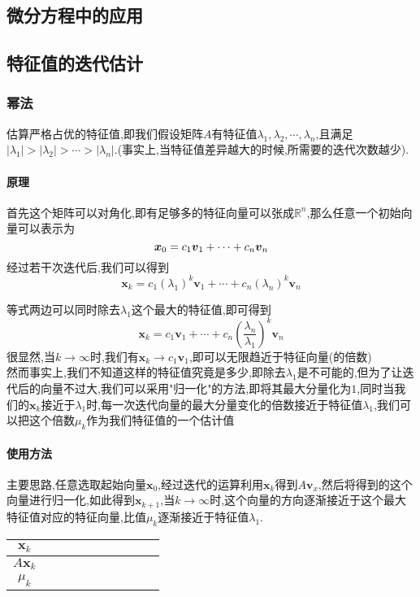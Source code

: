 \documentclass{article}
\newcommand{\RR}{\mathbb{R}}
\newcommand{\ve}{\boldsymbol}
\begin{document}
\begin{CJK}{UTF8}{gkai}
\subsection{微分方程中的应用}

\subsection{特征值的迭代估计}
\subsubsection{幂法}
估算严格占优的特征值,即我们假设矩阵$A$有特征值$\lambda_1 ,\lambda_2,\cdots,\lambda_n$,且满足$|\lambda_1|>|\lambda_2|>\cdots > |\lambda_n|$.(事实上,当特征值差异越大的时候,所需要的迭代次数越少).\\

\paragraph{原理\\}
首先这个矩阵可以对角化,即有足够多的特征向量可以张成$\RR^n$,那么任意一个初始向量可以表示为
\[\ve{x}_0 = \cvs{c}{v}{+}{1}{n}\]
经过若干次迭代后,我们可以得到
\[\ve{x}_k = c_1 (\lambda_1)^k \ve{v}_1 + \cdots + c_n (\lambda_n)^k \ve{v}_n\]

等式两边可以同时除去$\lambda_1$这个最大的特征值,即可得到
\[\ve{x}_k = c_1 \ve{v}_1 + \cdots + c_n (\dfrac{\lambda_n}{\lambda_1})^k \ve{v}_n\]
很显然,当$k\to\infty$时,我们有$\ve{x}_k\to c_1 \ve{v}_1$,即可以无限趋近于特征向量(的倍数)\\

然而事实上,我们不知道这样的特征值究竟是多少,即除去$\lambda_1$是不可能的,但为了让迭代后的向量不过大,我们可以采用"归一化"的方法,即将其最大分量化为$1$,同时当我们的$\ve{x}_k$接近于$\lambda_1$时,每一次迭代向量的最大分量变化的倍数接近于特征值$\lambda_1$,我们可以把这个倍数$\mu_k$作为我们特征值的一个估计值\\

\paragraph{使用方法\\}
主要思路,任意选取起始向量$\ve{x}_0$,经过迭代的运算利用$\ve{x}_k$得到$A\ve{v}_{x}$,然后将得到的这个向量进行归一化,如此得到$\ve{x}_{k + 1}$,当$k\to \infty$时,这个向量的方向逐渐接近于这个最大特征值对应的特征向量,比值$\mu_k$逐渐接近于特征值$\lambda_1$.

\begin{tabular}{|c|c|c|c|c|c|c|c|c|c|}
    \hline
$\ve{x}_k$& \quad\quad&\quad \quad&\quad \quad&\quad \quad&\quad \quad& \quad\quad&\quad \quad&\quad\quad&\quad\quad\\
    \hline
$A\ve{x}_k$&&&&&&&&&\\
    \hline
$\mu_k$&&&&&&&&&\\
    \hline
\end{tabular}


\end{CJK}
\end{document}
